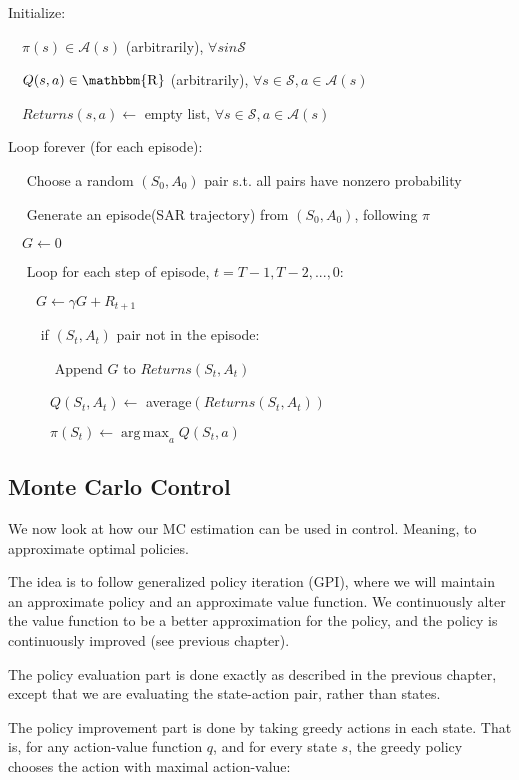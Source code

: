 \documentclass[lang=en,mode=geye,device=normal,color=blue,14pt]{elegantnote}
\DeclareMathOperator*{\1}{\mathbbm{1}}
\DeclareMathOperator*{\R}{\mathbbm{R}}
\DeclareMathOperator*{\argmax}{arg\,max}
\begin{document}
\begin{tcolorbox}[width=1.1\textwidth,title={MC Exploring Starts, for estimating $V \approx v_\pi$}]
Initialize:

$\quad \pi(s) \in \mathcal{A}(s)$ (arbitrarily), $\forall s in \mathcal{S}$

$\quad Q(s,a) \in \R$ (arbitrarily), $\forall s \in \mathcal{S}, a \in \mathcal{A}(s)$

$\quad Returns(s,a) \leftarrow$ empty list, $\forall s \in \mathcal{S}, a \in \mathcal{A}(s)$

Loop forever (for each episode):

$\quad$ Choose a random $(S_0, A_0)$ pair s.t. all pairs have nonzero probability

$\quad$ Generate an episode(SAR trajectory) from $(S_0, A_0)$, following $\pi$

$\quad G \leftarrow 0$

$\quad$ Loop for each step of episode, $t = T-1, T-2, ..., 0$:

$\quad\quad G\leftarrow \gamma G + R_{t+1}$

$\quad\quad$ if $(S_t, A_t)$ pair not in the episode:

$\quad\quad\quad$ Append $G$ to $Returns(S_t, A_t)$

$\quad\quad\quad Q(S_t, A_t) \leftarrow$ average$(Returns(S_t, A_t))$

$\quad\quad\quad \pi(S_t) \leftarrow \argmax_a Q(S_t, a)$

\end{tcolorbox}

\subsection{Monte Carlo Control}


We now look at how our MC estimation can be used in control. Meaning, to approximate optimal policies.

The idea is to follow generalized policy iteration (GPI), where we will maintain an approximate policy and an approximate value function.
We continuously alter the value function to be a better approximation for the policy, and the policy is continuously improved (see previous chapter).


The policy evaluation part is done exactly as described in the previous chapter, except that we are evaluating the state-action pair, rather than states.

The policy improvement part is done by taking greedy actions in each state. That is, for any action-value function $q$, and for every state $s$, the greedy policy chooses the action with maximal action-value:
\end{document}
